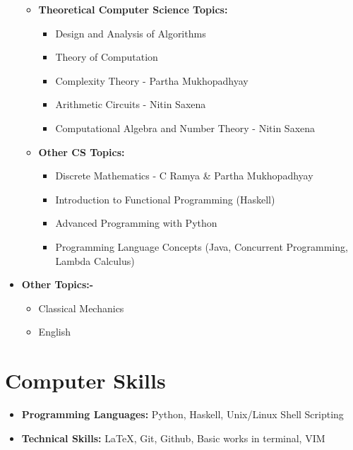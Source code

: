 \documentclass[10pt,a4paper,sans]{moderncv}        %
\begin{document}
\begin{itemize}
\begin{itemize}
				\item \textbf{Theoretical Computer Science Topics:} \begin{itemize}
					\item Design and Analysis of Algorithms
					\item Theory of Computation
					\item Complexity Theory - Partha Mukhopadhyay 
					\item Arithmetic Circuits - Nitin Saxena
					\item Computational Algebra and Number Theory - Nitin Saxena
				\end{itemize}
				\vspace*{5mm}
				\item \textbf{Other CS Topics:} \begin{itemize}
					\item Discrete Mathematics - C Ramya \& Partha Mukhopadhyay
					\item Introduction to Functional Programming (Haskell)
					\item Advanced Programming with Python
					\item Programming Language Concepts (Java, Concurrent Programming, Lambda Calculus)
				\end{itemize}
				
				
		\end{itemize}
	\vspace*{5mm}
	\item \textbf{Other Topics:-}
	\begin{itemize}
		\item Classical Mechanics
		\item English
	\end{itemize}
		
	
\end{itemize}
	

	
	\section{Computer Skills}
	
	\begin{itemize}
		
		\item \textbf{Programming Languages:} Python, Haskell, Unix/Linux Shell Scripting
		
		\item \textbf{Technical Skills:} \LaTeX, Git, Github, Basic works in terminal, VIM
		
		
	\end{itemize}
\end{document}
